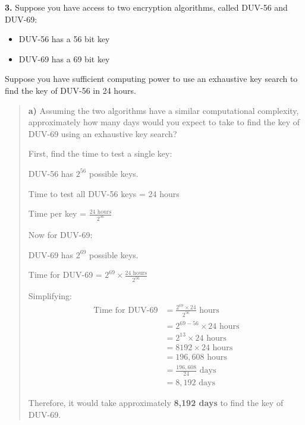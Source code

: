 \documentclass[12pt]{article}
\begin{document}

\noindent\textbf{3.} Suppose you have access to two encryption algorithms, called DUV-56 and DUV-69:
\begin{itemize}
\item DUV-56 has a 56 bit key
\item DUV-69 has a 69 bit key
\end{itemize}

Suppose you have sufficient computing power to use an exhaustive key search to find the key of DUV-56 in 24 hours.

\vspace{0.5cm}

\begin{quote}
\textbf{a)} Assuming the two algorithms have a similar computational complexity, approximately how many days would you expect to take to find the key of DUV-69 using an exhaustive key search?

\vspace{0.3cm}

First, find the time to test a single key:

DUV-56 has $2^{56}$ possible keys.

Time to test all DUV-56 keys = 24 hours

Time per key = $\frac{24 \text{ hours}}{2^{56}}$

\vspace{0.3cm}

Now for DUV-69:

DUV-69 has $2^{69}$ possible keys.

Time for DUV-69 = $2^{69} \times \frac{24 \text{ hours}}{2^{56}}$

\vspace{0.3cm}

Simplifying:
\begin{align*}
\text{Time for DUV-69} &= \frac{2^{69} \times 24}{2^{56}} \text{ hours}\\
&= 2^{69-56} \times 24 \text{ hours}\\
&= 2^{13} \times 24 \text{ hours}\\
&= 8192 \times 24 \text{ hours}\\
&= 196,608 \text{ hours}\\
&= \frac{196,608}{24} \text{ days}\\
&= 8,192 \text{ days}
\end{align*}

Therefore, it would take approximately \textbf{8,192 days} to find the key of DUV-69.


\end{quote}
\end{document}
